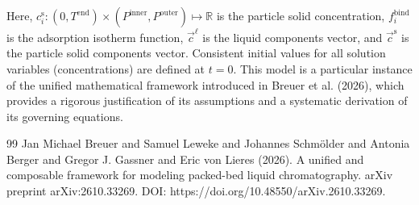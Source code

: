 \documentclass{article}
\begin{document}
Here, $c^{\mathrm{s}}_{i}\colon (0, T^{\mathrm{end}}) \times (P^{\mathrm{inner}}, P^{\mathrm{outer}}) \mapsto \mathbb{R}$ is the particle solid concentration, $f^{\mathrm{bind}}_{i}$ is the adsorption isotherm function, $\vec{c}^{\mathrm{\ell}}$ is the liquid components vector, and $\vec{c}^{\mathrm{s}}$ is the particle solid components vector.
Consistent initial values for all solution variables (concentrations) are defined at $t = 0$.
This model is a particular instance of the unified mathematical framework introduced in Breuer et al. (2026), which provides a rigorous justification of its assumptions and a systematic derivation of its governing equations.
\begin{thebibliography}{99}
     Jan Michael Breuer and Samuel Leweke and Johannes Schmölder and Antonia Berger and Gregor J. Gassner and Eric von Lieres (2026). A unified and composable framework for modeling packed-bed liquid chromatography. arXiv preprint arXiv:2610.33269. DOI: https://doi.org/10.48550/arXiv.2610.33269.
\end{thebibliography}
\end{document}
